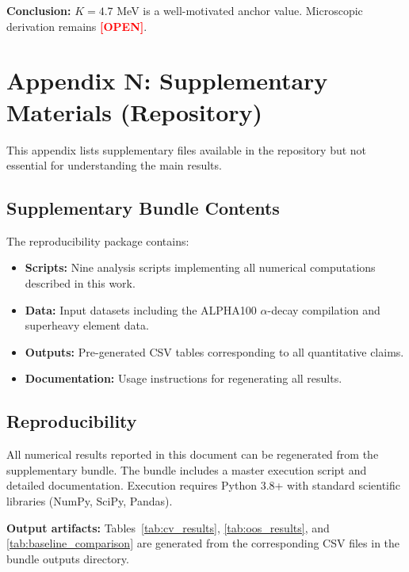 \documentclass[11pt,a4paper]{article}
\newcommand{\tagOPEN}{\textcolor{red}{\textbf{[OPEN]}}}
\begin{document}
\textbf{Conclusion:} $K = 4.7$ MeV is a well-motivated anchor value. Microscopic derivation remains \tagOPEN{}.

\section{Appendix N: Supplementary Materials (Repository)}
\label{app:supplementary}

This appendix lists supplementary files available in the repository but not essential for understanding the main results.

\subsection{Supplementary Bundle Contents}

The reproducibility package contains:
\begin{itemize}[nosep]
    \item \textbf{Scripts:} Nine analysis scripts implementing all numerical computations described in this work.
    \item \textbf{Data:} Input datasets including the ALPHA100 $\alpha$-decay compilation and superheavy element data.
    \item \textbf{Outputs:} Pre-generated CSV tables corresponding to all quantitative claims.
    \item \textbf{Documentation:} Usage instructions for regenerating all results.
\end{itemize}

\subsection{Reproducibility}

All numerical results reported in this document can be regenerated from the supplementary bundle. The bundle includes a master execution script and detailed documentation. Execution requires Python 3.8+ with standard scientific libraries (NumPy, SciPy, Pandas).

\textbf{Output artifacts:} Tables~\ref{tab:cv_results}, \ref{tab:oos_results}, and \ref{tab:baseline_comparison} are generated from the corresponding CSV files in the bundle outputs directory.
\end{document}
